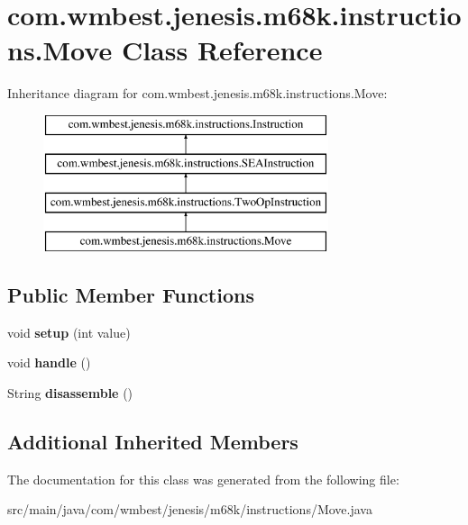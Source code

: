 \hypertarget{classcom_1_1wmbest_1_1jenesis_1_1m68k_1_1instructions_1_1Move}{\section{com.\-wmbest.\-jenesis.\-m68k.\-instructions.\-Move Class Reference}
\label{classcom_1_1wmbest_1_1jenesis_1_1m68k_1_1instructions_1_1Move}
}
Inheritance diagram for com.\-wmbest.\-jenesis.\-m68k.\-instructions.\-Move\-:\begin{figure}[H]
\begin{center}
\leavevmode
\includegraphics[height=4.000000cm]{classcom_1_1wmbest_1_1jenesis_1_1m68k_1_1instructions_1_1Move}
\end{center}
\end{figure}
\subsection*{Public Member Functions}
\begin{DoxyCompactItemize}
\item 
\hypertarget{classcom_1_1wmbest_1_1jenesis_1_1m68k_1_1instructions_1_1Move_a9ae55dd5389636bd5b22dd052c577410}{void {\bfseries setup} (int value)}\label{classcom_1_1wmbest_1_1jenesis_1_1m68k_1_1instructions_1_1Move_a9ae55dd5389636bd5b22dd052c577410}

\item 
\hypertarget{classcom_1_1wmbest_1_1jenesis_1_1m68k_1_1instructions_1_1Move_aeb72e6d56d0fd5a581c0aea951e6bb49}{void {\bfseries handle} ()}\label{classcom_1_1wmbest_1_1jenesis_1_1m68k_1_1instructions_1_1Move_aeb72e6d56d0fd5a581c0aea951e6bb49}

\item 
\hypertarget{classcom_1_1wmbest_1_1jenesis_1_1m68k_1_1instructions_1_1Move_a6b084bbdafeac7fcea4a9664c406b2e4}{String {\bfseries disassemble} ()}\label{classcom_1_1wmbest_1_1jenesis_1_1m68k_1_1instructions_1_1Move_a6b084bbdafeac7fcea4a9664c406b2e4}

\end{DoxyCompactItemize}
\subsection*{Additional Inherited Members}


The documentation for this class was generated from the following file\-:\begin{DoxyCompactItemize}
\item 
src/main/java/com/wmbest/jenesis/m68k/instructions/Move.\-java\end{DoxyCompactItemize}
